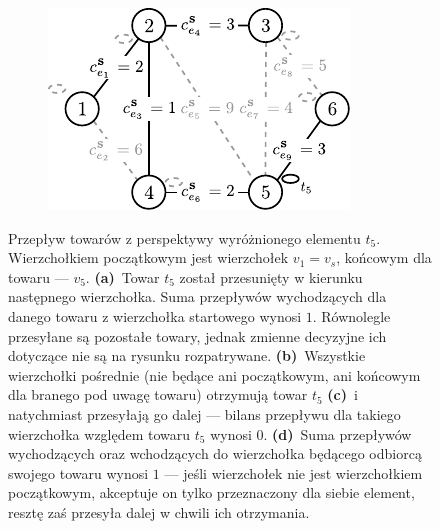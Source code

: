 \begin{figure}[!htbp]
\begin{subfigure}[b]{0.242\textwidth}
		\caption{}
		\label{fig:mst4Example:c}
	\end{subfigure}
	\hfill
	\begin{subfigure}[b]{0.242\textwidth}
		\includegraphics[width=\textwidth]{Chapter_III/MST4-example/d}
		\caption{}
		\label{fig:mst4Example:d}
	\end{subfigure}
	\hfill\null
	\caption{
		Przepływ towarów z perspektywy wyróżnionego elementu $t_{5}$. Wierzchołkiem początkowym jest wierzchołek $v_{1} = v_{s}$, końcowym dla towaru --- $v_{5}$.
		\textbf{(a)}~Towar $t_{5}$ został przesunięty w kierunku następnego wierzchołka. Suma przepływów wychodzących dla danego towaru z wierzchołka startowego wynosi $1$. Równolegle przesyłane są pozostałe towary, jednak zmienne decyzyjne ich dotyczące nie są na rysunku rozpatrywane.
		\textbf{(b)}~Wszystkie wierzchołki pośrednie (nie będące ani początkowym, ani końcowym dla branego pod uwagę towaru) otrzymują towar $t_{5}$ 
		\textbf{(c)}~i natychmiast przesyłają go dalej --- bilans przepływu dla takiego wierzchołka względem towaru $t_{5}$ wynosi $0$.
		\textbf{(d)}~Suma przepływów wychodzących oraz wchodzących do wierzchołka będącego odbiorcą swojego towaru wynosi $1$ --- jeśli wierzchołek nie jest wierzchołkiem początkowym, akceptuje on tylko przeznaczony dla siebie element, resztę zaś przesyła dalej w chwili ich otrzymania.
	}
	\label{fig:mst4Example}
\end{figure}

